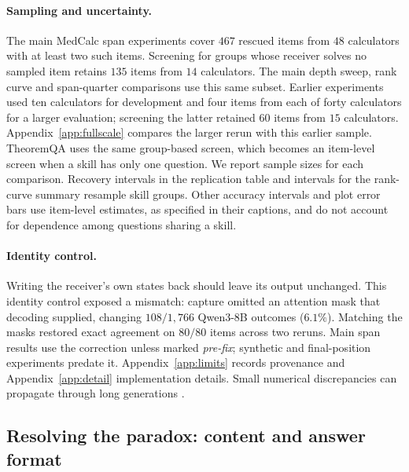 \documentclass{article}
\begin{document}
\paragraph{Sampling and uncertainty.}
The main MedCalc span experiments cover $467$ rescued items from $48$
calculators with at least two such items. Screening for groups whose receiver
solves no sampled item retains $135$ items from $14$ calculators. The main
depth sweep, rank curve and span-quarter comparisons use this same subset.
Earlier experiments used ten calculators for development and four items from
each of forty calculators for a larger evaluation; screening the latter
retained $60$ items from $15$ calculators. Appendix~\ref{app:fullscale}
compares the larger rerun with this earlier sample. TheoremQA uses the same
group-based screen, which becomes an item-level screen when a skill has only
one question. We report sample sizes for each comparison. Recovery intervals
in the replication table and intervals for the rank-curve summary resample
skill groups. Other accuracy intervals and plot error bars use item-level
estimates, as specified in their captions, and do not account for dependence
among questions sharing a skill.

\paragraph{Identity control.}
Writing the receiver's own states back should leave its output unchanged.
This identity control exposed a mismatch: capture omitted an attention mask
that decoding supplied, changing $108/1{,}766$ Qwen3-8B outcomes ($6.1\%$).
Matching the masks restored exact agreement on $80/80$ items across two reruns.
Main span results use the correction unless marked \emph{pre-fix}; synthetic
and final-position experiments predate it. Appendix~\ref{app:limits} records
provenance and Appendix~\ref{app:detail} implementation details. Small numerical
discrepancies can propagate through long generations \citep{he2025nondeterminism}.

\subsection{Resolving the paradox: content and answer format}
\label{sec:decomp}
\end{document}
